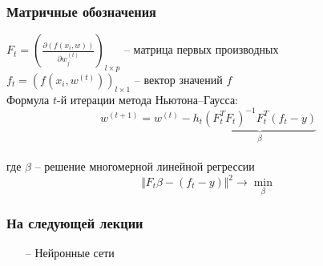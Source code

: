 \documentclass[12pt]{beamer}
\begin{document}
\begin{frame}\frametitle{Матричные обозначения}
$F_t = \left(\frac{\partial(f(x_i, w))}{\partial w_j^{(t)}}\right)_{l \times p}$ -- матрица первых производных\\
$f_t = \left( f(x_i, w^{(t)}) \right)_{l \times 1}$ -- вектор значений $f$\\
\vspace{5mm}
Формула $t$-й итерации метода Ньютона–Гаусса:\\
$$w^{(t+1)} = w^{(t)} - h_t \underbrace{\left( F^T_tF_t \right)^{-1} F_t^T(f_t -y)}_{\beta}$$\\
где $\beta$ -- решение многомерной линейной регрессии\\
$$\Vert F_t\beta - (f_t-y) \Vert^2 \rightarrow \min_{\beta}$$ 
\end{frame}



\begin{frame}\frametitle{На следующей лекции}
\begin{itemize}
\item[--] Нейронные сети
\end{itemize}
\end{frame}
\end{document}

